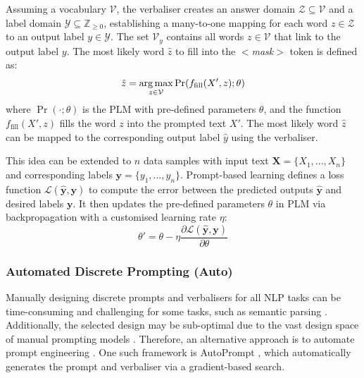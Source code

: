 Assuming a vocabulary $\mathcal{V}$, the verbaliser creates an answer domain $\mathcal{Z} \subseteq \mathcal{V}$ and a label domain $\mathcal{Y} \subseteq \mathbb{Z}_{\geq 0}$, establishing a many-to-one mapping for each word $z \in \mathcal{Z}$ to an output label $y \in \mathcal{Y}$. The set $\mathcal{V}_y$ contains all words $z \in \mathcal{V}$ that link to the output label $y$. The most likely word $\hat{z}$ to fill into the $<$\textit{mask}$>$ token is defined as: 
\begin{equation} 
\hat{z} = \operatorname*{arg\,max}_{z\in \mathcal{V}} \Pr(f_{\text{fill}}(X', z);\theta)
\end{equation}
where $\Pr(\cdot; \theta)$ is the PLM with pre-defined parameters $\theta$, and the function $f_{\text{fill}}(X', z)$ fills the word $z$ into the prompted text $X'$. The most likely word $\hat{z}$ can be mapped to the corresponding output label $\hat{y}$ using the verbaliser.

This idea can be extended to $n$ data samples with input text $\mathbf{X} = \{X_1, ..., X_n\}$ and corresponding labels $\mathbf{y} = \{y_1, ..., y_n\}$. Prompt-based learning defines a loss function $\mathcal{L}(\hat{\mathbf{y}}, \mathbf{y})$ to compute the error between the predicted outputs $\hat{\mathbf{y}}$ and desired labels $\mathbf{y}$. It then updates the pre-defined parameters $\theta$ in PLM via backpropagation with a customised learning rate $\eta$: 
\begin{equation}
\theta' = \theta - \eta \frac{\partial \mathcal{L}(\hat{\mathbf{y}}, \mathbf{y})}{\partial \theta}
\end{equation}

\subsubsection{Automated Discrete Prompting (Auto)}
Manually designing discrete prompts and verbalisers for all NLP tasks can be time-consuming and challenging for some tasks, such as semantic parsing \cite{Shin21Auto}. Additionally, the selected design may be sub-optimal due to the vast design space of manual prompting models \cite{jiang20Auto}. Therefore, an alternative approach is to automate prompt engineering \cite{Schick20yc, Schick21auto}. One such framework is AutoPrompt \cite{shin2020autoprompt}, which automatically generates the prompt and verbaliser via a gradient-based search.

